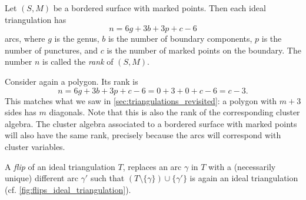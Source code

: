 \begin{proposition}\label{prop:rank_triangulation}

	Let $(S, M)$ be a bordered surface with marked points. Then each ideal triangulation
	has
	\begin{equation*}
		n = 6g + 3b + 3p + c -6
	\end{equation*}
	arcs, where $g$ is the genus, $b$ is the number of boundary components, $p$ is the number of punctures, and $c$ is the number of marked points on the boundary. The number $n$ is called the \emph{rank} of $(S, M)$.
\end{proposition}

Consider again a polygon. Its rank is
\begin{equation*}
	n = 6g + 3b + 3p + c - 6 = 0 + 3 + 0 + c - 6 = c - 3.
\end{equation*}
%
This matches what we saw in \cref{sec:triangulations_revisited}: a polygon with $m + 3$
sides has $m$ diagonals. Note that this is also the rank of the corresponding cluster
algebra. The cluster algebra associated to a bordered surface with marked points will
also have the same rank, precisely because the arcs will correspond with cluster
variables.

\begin{definition}

	A \emph{flip} of an ideal triangulation $T$, replaces an arc
	$\gamma$ in $T$ with a (necessarily unique) different arc $\gamma'$ such that $(T
		\setminus \{\gamma\}) \cup \{\gamma'\}$ is again an ideal triangulation (cf.
	\cref{fig:flips_ideal_triangulation}).
\end{definition}

